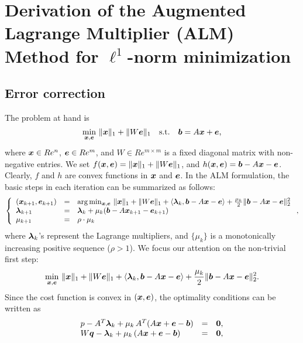 \section{Derivation of the Augmented Lagrange Multiplier (ALM) Method for $\ell^1$-norm minimization}

\subsection{Error correction}

The problem at hand is 
\begin{equation}
\min_{{\boldsymbol{x}},\boldsymbol{e}} \, \|{\boldsymbol{x}}\|_1 + \|W\boldsymbol{e}\|_1 \quad \mathrm{s.t.} \quad \boldsymbol{b} = A{\boldsymbol{x}} + \boldsymbol{e},
\end{equation}
where ${\boldsymbol{x}} \in Re^n$, $\boldsymbol{e} \in Re^m$, and $W \in Re^{m \times m}$ is a fixed diagonal matrix with non-negative entries. 
\smallbreak
We set $f({\boldsymbol{x}},\boldsymbol{e}) = \|{\boldsymbol{x}}\|_1 + \|W\boldsymbol{e}\|_1$, and $h({\boldsymbol{x}},\boldsymbol{e}) = \boldsymbol{b} - A{\boldsymbol{x}} - \boldsymbol{e}$. Clearly, $f$ and $h$ are convex functions in ${\boldsymbol{x}}$ and $\boldsymbol{e}$. In the ALM formulation, the basic steps in each iteration can be summarized as follows:
\begin{equation}
\left \{ 
\begin{array}{lll}
({\boldsymbol{x}}_{k+1},\boldsymbol{e}_{k+1}) & = & \arg\min_{{\boldsymbol{x}},\boldsymbol{e}} \, \|{\boldsymbol{x}}\|_1 + \|W\boldsymbol{e}\|_1 + \langle \boldsymbol{\lambda}_k, \boldsymbol{b} - A{\boldsymbol{x}} - \boldsymbol{e} \rangle + \frac{\mu_k}{2}\|\boldsymbol{b} - A{\boldsymbol{x}} - \boldsymbol{e}\|_2^2 \\
\boldsymbol{\lambda}_{k+1} & = & \boldsymbol{\lambda}_k + \mu_k (\boldsymbol{b} - A{\boldsymbol{x}}_{k+1} - \boldsymbol{e}_{k+1}) \\
\mu_{k+1} & = & \rho\cdot\mu_k
\end{array} 
\right . ,
\end{equation}
where $\boldsymbol{\lambda}_k$'s represent the Lagrange multipliers, and $\{\mu_k\}$ is a monotonically increasing positive sequence ($\rho > 1$).
\smallbreak
We focus our attention on the non-trivial first step:
\begin{equation}
\min_{{\boldsymbol{x}},\boldsymbol{e}} \, \|{\boldsymbol{x}}\|_1 + \|W\boldsymbol{e}\|_1 + \langle \boldsymbol{\lambda}_k, \boldsymbol{b} - A{\boldsymbol{x}} - \boldsymbol{e} \rangle + \frac{\mu_k}{2}\|\boldsymbol{b} - A{\boldsymbol{x}} - \boldsymbol{e}\|_2^2.
\label{eqn:alm}
\end{equation}
Since the cost function is convex in $({\boldsymbol{x}},\boldsymbol{e})$, the optimality conditions can be written as
\begin{equation}
\begin{array}{lll}
{p} - A^T\boldsymbol{\lambda}_k + \mu_k\,A^T(A{\boldsymbol{x}} + \boldsymbol{e} - \boldsymbol{b}) & = & \boldsymbol{0}, \\
W{\boldsymbol q} - \boldsymbol{\lambda}_k + \mu_k\, (A{\boldsymbol{x}} + \boldsymbol{e} -\boldsymbol{b}) & = & \boldsymbol{0},
\end{array}
\end{equation}
